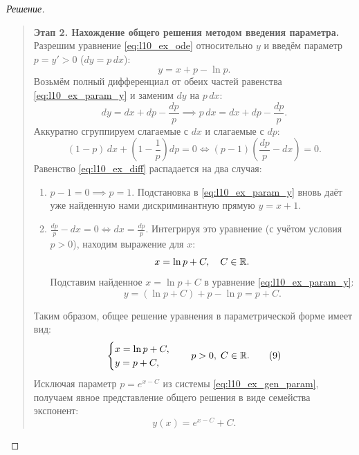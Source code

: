 \begin{example}
\begin{proof}[Решение]
\begin{quote}
            \textbf{Этап 2. Нахождение общего решения методом введения
            параметра.}\\
            Разрешим уравнение \eqref{eq:l10_ex_ode} относительно $y$ и введём
            параметр $p = y' > 0$ ($dy = p \, dx$):
            \begin{equation} \label{eq:l10_ex_param_y}
                y = x + p - \ln p. \tag{7}
            \end{equation}
            Возьмём полный дифференциал от обеих частей равенства
            \eqref{eq:l10_ex_param_y} и заменим $dy$ на $p \, dx$:
            \[
                dy = dx + dp - \frac{dp}{p} \implies
                p \, dx = dx + dp - \frac{dp}{p}.
            \]
            Аккуратно сгруппируем слагаемые с $dx$ и слагаемые с $dp$:
            \begin{equation} \label{eq:l10_ex_diff}
                (1 - p) \, dx + \left(1 - \frac{1}{p}\right) dp = 0 \iff
                (p - 1)\left(\frac{dp}{p} - dx\right) = 0. \tag{8}
            \end{equation}
            Равенство \eqref{eq:l10_ex_diff} распадается на два случая:
            \begin{enumerate}
                \item $p - 1 = 0 \implies p = 1$. Подстановка в
                \eqref{eq:l10_ex_param_y} вновь даёт уже найденную нами
                дискриминантную прямую $y = x + 1$.
                \item $\frac{dp}{p} - dx = 0 \iff dx = \frac{dp}{p}$.
                Интегрируя это уравнение (с учётом условия $p > 0$), находим
                выражение для $x$:
                \[
                    x = \ln p + C, \quad C \in \mathbb{R}.
                \]
                Подставим найденное $x = \ln p + C$ в уравнение
                \eqref{eq:l10_ex_param_y}:
                \[
                    y = (\ln p + C) + p - \ln p = p + C.
                \]
            \end{enumerate}
            Таким образом, общее решение уравнения в параметрической форме
            имеет вид:
            \begin{equation} \label{eq:l10_ex_gen_param}
                \begin{cases}
                    x = \ln p + C, \\
                    y = p + C,
                \end{cases}
                \quad p > 0, \; C \in \mathbb{R}. \tag{9}
            \end{equation}
            Исключая параметр $p = e^{x - C}$ из системы
            \eqref{eq:l10_ex_gen_param}, получаем явное представление общего
            решения в виде семейства экспонент:
            \begin{equation} \label{eq:l10_ex_gen_exp}
                y(x) = e^{x - C} + C. \tag{10}
            \end{equation}


\end{quote}
\end{proof}
\end{example}
